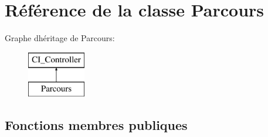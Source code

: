 \hypertarget{class_parcours}{}\section{Référence de la classe Parcours}
\label{class_parcours}
Graphe d\textquotesingle{}héritage de Parcours\+:\begin{figure}[H]
\begin{center}
\leavevmode
\includegraphics[height=2.000000cm]{class_parcours}
\end{center}
\end{figure}
\subsection*{Fonctions membres publiques}
